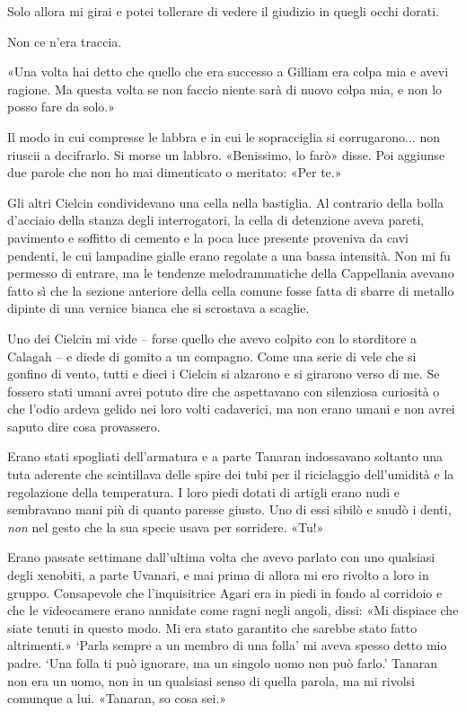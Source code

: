 Solo allora mi girai e potei tollerare di vedere il giudizio in quegli
occhi dorati.

Non ce n'era traccia.

«Una volta hai detto che quello che era successo a Gilliam era colpa mia
e avevi ragione. Ma questa volta se non faccio niente sarà di nuovo
colpa mia, e non lo posso fare da solo.»

Il modo in cui compresse le labbra e in cui le sopracciglia si
corrugarono... non riuscii a decifrarlo. Si morse un labbro. «Benissimo,
lo farò» disse. Poi aggiunse due parole che non ho mai dimenticato o
meritato: «Per te.»

\begin{figure}
	\centering
	\def\svgwidth{\columnwidth}
	\scalebox{0.2}{}
\end{figure}

Gli altri Cielcin condividevano una cella nella bastiglia. Al contrario
della bolla d'acciaio della stanza degli interrogatori, la cella di
detenzione aveva pareti, pavimento e soffitto di cemento e la poca luce
presente proveniva da cavi pendenti, le cui lampadine gialle erano
regolate a una bassa intensità. Non mi fu permesso di entrare, ma le
tendenze melodrammatiche della Cappellania avevano fatto sì che la
sezione anteriore della cella comune fosse fatta di sbarre di metallo
dipinte di una vernice bianca che si scrostava a scaglie.

Uno dei Cielcin mi vide -- forse quello che avevo colpito con lo
storditore a Calagah -- e diede di gomito a un compagno. Come una serie
di vele che si gonfino di vento, tutti e dieci i Cielcin si alzarono e
si girarono verso di me. Se fossero stati umani avrei potuto dire che
aspettavano con silenziosa curiosità o che l'odio ardeva gelido nei loro
volti cadaverici, ma non erano umani e non avrei saputo dire cosa
provassero.

Erano stati spogliati dell'armatura e a parte Tanaran indossavano
soltanto una tuta aderente che scintillava delle spire dei tubi per il
riciclaggio dell'umidità e la regolazione della temperatura. I loro
piedi dotati di artigli erano nudi e sembravano mani più di quanto
paresse giusto. Uno di essi sibilò e snudò i denti, \emph{non} nel gesto
che la sua specie usava per sorridere. «Tu!»

Erano passate settimane dall'ultima volta che avevo parlato con uno
qualsiasi degli xenobiti, a parte Uvanari, e mai prima di allora mi ero
rivolto a loro in gruppo. Consapevole che l'inquisitrice Agari era in
piedi in fondo al corridoio e che le videocamere erano annidate come
ragni negli angoli, dissi: «Mi dispiace che siate tenuti in questo modo.
Mi era stato garantito che sarebbe stato fatto altrimenti.» `Parla
sempre a un membro di una folla' mi aveva spesso detto mio padre. `Una
folla ti può ignorare, ma un singolo uomo non può farlo.' Tanaran non
era un uomo, non in un qualsiasi senso di quella parola, ma mi rivolsi
comunque a lui. «Tanaran, so cosa sei.»

